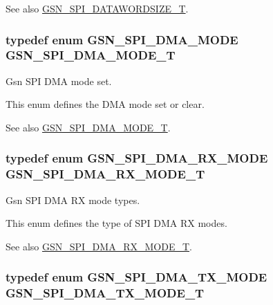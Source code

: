 \begin{DoxySeeAlso}{See also}
\hyperlink{a00655_ga63cbe81427185213bde26b93dde72747}{GSN\_\-SPI\_\-DATAWORDSIZE\_\-T}. 
\end{DoxySeeAlso}
\hypertarget{a00655_gafff743b26bbfafb380a9797457935a0e}{
\subsubsection[{GSN\_\-SPI\_\-DMA\_\-MODE\_\-T}]{\setlength{\rightskip}{0pt plus 5cm}typedef enum {\bf GSN\_\-SPI\_\-DMA\_\-MODE}  {\bf GSN\_\-SPI\_\-DMA\_\-MODE\_\-T}}}
\label{a00655_gafff743b26bbfafb380a9797457935a0e}


Gsn SPI DMA mode set. 

This enum defines the DMA mode set or clear. \begin{DoxySeeAlso}{See also}
\hyperlink{a00655_gafff743b26bbfafb380a9797457935a0e}{GSN\_\-SPI\_\-DMA\_\-MODE\_\-T}. 
\end{DoxySeeAlso}
\hypertarget{a00655_ga884b22be3cf70e4b96a0cda9b704390a}{
\subsubsection[{GSN\_\-SPI\_\-DMA\_\-RX\_\-MODE\_\-T}]{\setlength{\rightskip}{0pt plus 5cm}typedef enum {\bf GSN\_\-SPI\_\-DMA\_\-RX\_\-MODE}  {\bf GSN\_\-SPI\_\-DMA\_\-RX\_\-MODE\_\-T}}}
\label{a00655_ga884b22be3cf70e4b96a0cda9b704390a}


Gsn SPI DMA RX mode types. 

This enum defines the type of SPI DMA RX modes. \begin{DoxySeeAlso}{See also}
\hyperlink{a00655_ga884b22be3cf70e4b96a0cda9b704390a}{GSN\_\-SPI\_\-DMA\_\-RX\_\-MODE\_\-T}. 
\end{DoxySeeAlso}
\hypertarget{a00655_ga39efef290b5dfeaaa7892823d6bfd724}{
\subsubsection[{GSN\_\-SPI\_\-DMA\_\-TX\_\-MODE\_\-T}]{\setlength{\rightskip}{0pt plus 5cm}typedef enum {\bf GSN\_\-SPI\_\-DMA\_\-TX\_\-MODE}  {\bf GSN\_\-SPI\_\-DMA\_\-TX\_\-MODE\_\-T}}}
\label{a00655_ga39efef290b5dfeaaa7892823d6bfd724}



